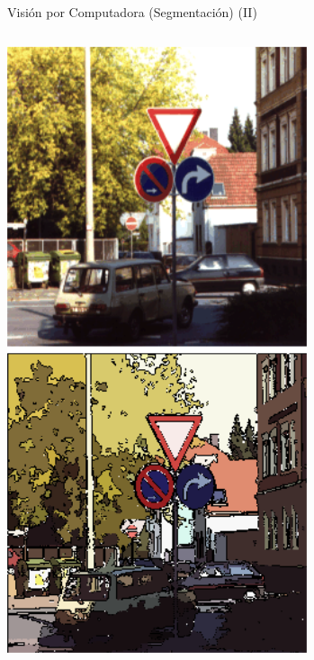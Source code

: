 \begin{frame}{Visión por Computadora (Segmentación) (II)}
\begin{columns}
        \begin{center}
            \includegraphics[width=\textwidth]{Figs/VC_Segmentacion}\\
     \end{center}

    \end{columns}
\end{frame}

